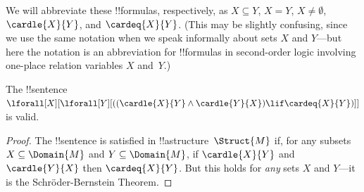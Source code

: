 \documentclass[../../../include/open-logic-section]{subfiles}
\begin{document}
We will abbreviate these !!{formula}s, respectively, as $X \subseteq Y$,
$X = Y$, $X \neq \emptyset$, $\cardle{X}{Y}$, and
$\cardeq{X}{Y}$. (This may be slightly confusing, since we use the
same notation when we speak informally about sets $X$ and $Y$---but
here the notation is an abbreviation for !!{formula}s in second-order
logic involving one-place relation variables $X$ and~$Y$.)

\begin{prop}
The !!{sentence} $\lforall[X][\lforall[Y][((\cardle{X}{Y} \land
    \cardle{Y}{X}) \lif \cardeq{X}{Y})]]$ is valid.
\end{prop}

\begin{proof}
The !!{sentence} is satisfied in !!a{structure}~$\Struct{M}$ if, for
any subsets $X \subseteq \Domain{M}$ and $Y \subseteq \Domain{M}$, if
$\cardle{X}{Y}$ and $\cardle{Y}{X}$ then $\cardeq{X}{Y}$.  But this
holds for \emph{any} sets $X$ and $Y$---it is the Schr\"oder-Bernstein
Theorem.
\end{proof}
\end{document}
